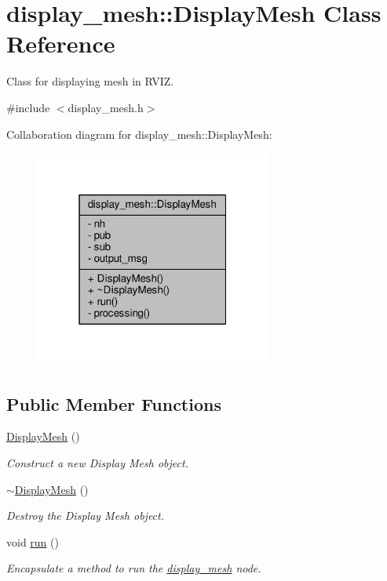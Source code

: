 \hypertarget{classdisplay__mesh_1_1_display_mesh}{}\section{display\+\_\+mesh\+:\+:Display\+Mesh Class Reference}
\label{classdisplay__mesh_1_1_display_mesh}


Class for displaying mesh in R\+V\+IZ.  




{\ttfamily \#include $<$display\+\_\+mesh.\+h$>$}



Collaboration diagram for display\+\_\+mesh\+:\+:Display\+Mesh\+:\nopagebreak
\begin{figure}[H]
\begin{center}
\leavevmode
\includegraphics[width=220pt]{classdisplay__mesh_1_1_display_mesh__coll__graph}
\end{center}
\end{figure}
\subsection*{Public Member Functions}
\begin{DoxyCompactItemize}
\item 
\hyperlink{classdisplay__mesh_1_1_display_mesh_a75e143fd00c1a1b777eea976f8580030}{Display\+Mesh} ()
\begin{DoxyCompactList}\small\item\em Construct a new Display Mesh object. \end{DoxyCompactList}\item 
\hyperlink{classdisplay__mesh_1_1_display_mesh_a39727abcea404714b69aa465dd6df4bb}{$\sim$\+Display\+Mesh} ()
\begin{DoxyCompactList}\small\item\em Destroy the Display Mesh object. \end{DoxyCompactList}\item 
void \hyperlink{classdisplay__mesh_1_1_display_mesh_ac41b88adcb0deeaa2d4febee382c4f14}{run} ()
\begin{DoxyCompactList}\small\item\em Encapsulate a method to run the \hyperlink{namespacedisplay__mesh}{display\+\_\+mesh} node. \end{DoxyCompactList}\end{DoxyCompactItemize}
